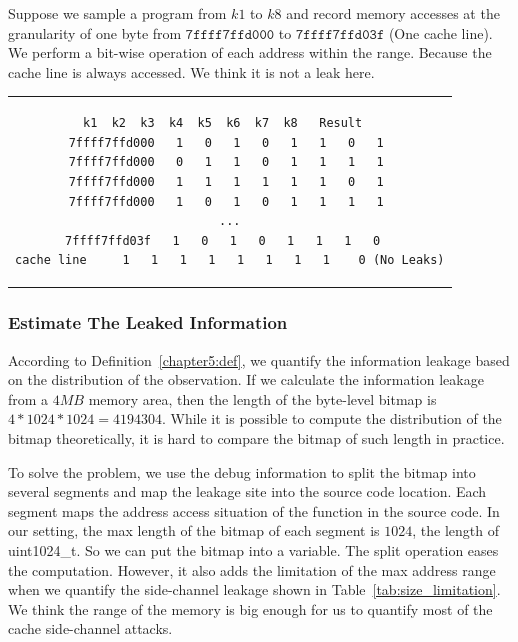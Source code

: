 \begin{myexample}
Suppose we sample a program from $k1$ to $k8$ and record memory accesses at the granularity of one byte from $\mathtt{7ffff7ffd000}$ to $\mathtt{7ffff7ffd03f}$ (One cache line). We perform a bit-wise operation of each address within the range. Because the cache line is always accessed. We think it is not a leak here.
\begin{center}
  \begin{tabular}{c}
    {
      \begin{lstlisting}[frame=none]
              k1  k2  k3  k4  k5  k6  k7  k8   Result  
7ffff7ffd000   1   0   1   0   1   1   0   1 
7ffff7ffd000   0   1   1   0   1   1   1   1 
7ffff7ffd000   1   1   1   1   1   1   0   1 
7ffff7ffd000   1   0   1   0   1   1   1   1 
...
7ffff7ffd03f   1   0   1   0   1   1   1   0  
cache line     1   1   1   1   1   1   1   1    0 (No Leaks)
\end{lstlisting}
    }
  \end{tabular}
\end{center}
\end{myexample}

\subsubsection{Estimate The Leaked Information}
According to Definition~\ref{chapter5:def}, we quantify the information leakage based on the distribution of the observation. If we calculate the information leakage from a $4MB$ memory area, then the length of the byte-level bitmap is $4*1024*1024 = 4194304$. While it is possible to compute the distribution of the bitmap theoretically, it is hard to compare the bitmap of such length in practice.

To solve the problem, we use the debug information to split the bitmap into several segments and map the leakage site into the source code location. Each segment maps the address access situation of the function in the source code. In our setting, the max length of the bitmap of each segment is $1024$, the length of \textsf{uint1024\_t}. So we can put the bitmap into a variable. The split operation eases the computation. However, it also adds the limitation of the max address range when we quantify the side-channel leakage shown in Table~\ref{tab:size_limitation}. We think the range of the memory is big enough for us to quantify most of the cache side-channel attacks.

\begin{table}[h]
  \centering
  \caption{The maximum range address range when we quantify the amount of the leakage with different granularity.}
  \label{tab:size_limitation}
\end{table}

